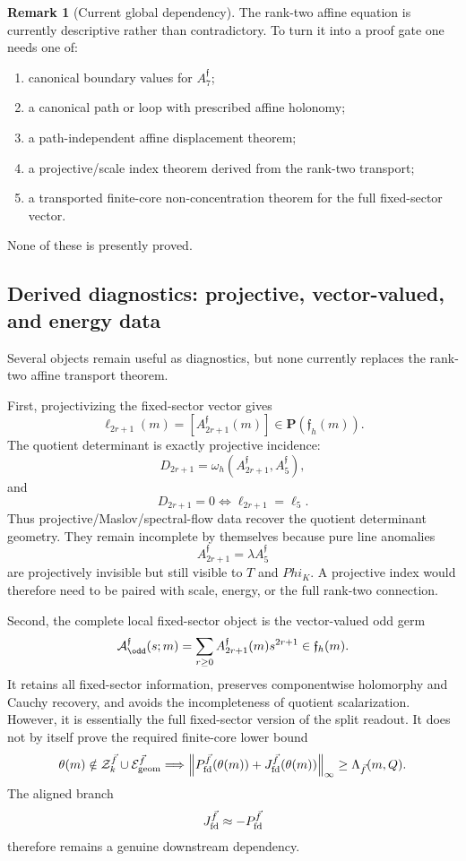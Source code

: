 \documentclass[11pt,a4paper]{amsart}
\def\Phi{Phi}%
\theoremstyle{plain}
\theoremstyle{definition}
\newtheorem{remark}[theorem]{Remark}
\begin{document}
\begin{remark}[Current global dependency]
\label{rem:current-global-affine-transport-dependency}
The rank-two affine equation is currently descriptive rather than
contradictory.  To turn it into a proof gate one needs one of:
\begin{enumerate}
\item canonical boundary values for \(A_7^{\mathfrak f}\);
\item a canonical path or loop with prescribed affine holonomy;
\item a path-independent affine displacement theorem;
\item a projective/scale index theorem derived from the rank-two transport;
\item a transported finite-core non-concentration theorem for the full
fixed-sector vector.
\end{enumerate}
None of these is presently proved.
\end{remark}

\subsection{Derived diagnostics: projective, vector-valued, and energy data}
\label{subsec:derived-diagnostics-projective-vector-energy}

Several objects remain useful as diagnostics, but none currently replaces the
rank-two affine transport theorem.

First, projectivizing the fixed-sector vector gives
\[
\ell_{2r+1}(m)
=
[A_{2r+1}^{\mathfrak f}(m)]
\in
\mathbf P(\mathfrak f_h(m)).
\]
The quotient determinant is exactly projective incidence:
\[
D_{2r+1}
=
\omega_h(A_{2r+1}^{\mathfrak f},A_5^{\mathfrak f}),
\]
and
\[
D_{2r+1}=0
\iff
\ell_{2r+1}=\ell_5.
\]
Thus projective/Maslov/spectral-flow data recover the quotient determinant
geometry.  They remain incomplete by themselves because pure line anomalies
\[
A_{2r+1}^{\mathfrak f}
=
\lambda A_5^{\mathfrak f}
\]
are projectively invisible but still visible to \(T\) and \(\Phi_K\).  A
projective index would therefore need to be paired with scale, energy, or the
full rank-two connection.

Second, the complete local fixed-sector object is the vector-valued odd germ
\[
\mathcal A_{\odd}^{\mathfrak f}(s;m)
=
\sum_{r\ge0}
A_{2r+1}^{\mathfrak f}(m)s^{2r+1}
\in
\mathfrak f_h(m).
\]
It retains all fixed-sector information, preserves componentwise holomorphy
and Cauchy recovery, and avoids the incompleteness of quotient scalarization.
However, it is essentially the full fixed-sector version of the split readout.
It does not by itself prove the required finite-core lower bound
\[
\theta(m)\notin
\mathcal Z_k^{\vec f}\cup\mathcal E_{\rm geom}^{\vec f}
\Longrightarrow
\left\|
P_{\rm fd}^{\vec f}(\theta(m))
+
J_{\rm fd}^{\vec f}(\theta(m))
\right\|_\infty
\ge
\Lambda_{\vec f}(m,Q).
\]
The aligned branch
\[
J_{\rm fd}^{\vec f}\approx -P_{\rm fd}^{\vec f}
\]
therefore remains a genuine downstream dependency.
\end{document}
